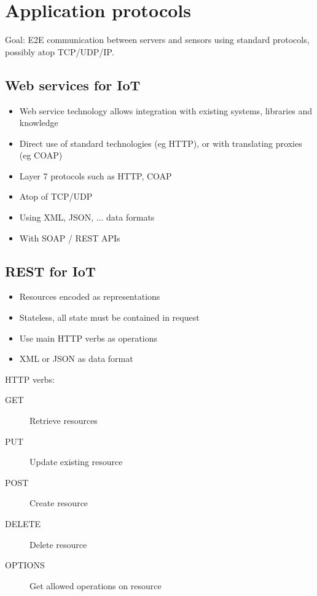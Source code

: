\section{Application protocols}

Goal: E2E communication between servers and sensors using standard protocols,
possibly atop TCP/UDP/IP.

\subsection{Web services for IoT}

\begin{itemize}
		\item Web service technology allows integration with existing systems,
				libraries and knowledge
		\item Direct use of standard technologies (eg HTTP), or with
				translating proxies (eg COAP)
		\item Layer 7 protocols such as HTTP, COAP
		\item Atop of TCP/UDP
		\item Using XML, JSON, ... data formats
		\item With SOAP / REST APIs
\end{itemize}

\subsection{REST for IoT}

\begin{itemize}
		\item Resources encoded as representations
		\item Stateless, all state must be contained in request
		\item Use main HTTP verbs as operations
		\item XML or JSON as data format
\end{itemize}

HTTP verbs:
\begin{description}
		\item[GET] Retrieve resources
		\item[PUT] Update existing resource
		\item[POST] Create resource
		\item[DELETE] Delete resource
		\item[OPTIONS] Get allowed operations on resource
\end{description}

